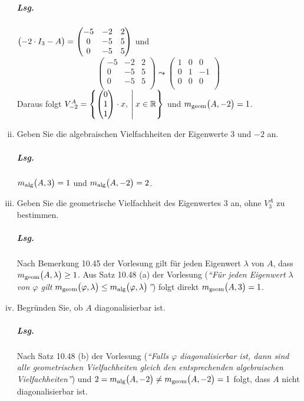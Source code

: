 \documentclass{scrreprt}
\begin{document}
\begin{enumerate}[(i)]
  \subparagraph{Lsg.} $\qty\big(-2 \cdot I_3 - A) =
  \begin{pmatrix}
    -5 & -2 & 2 \\
    0 & -5 & 5 \\
    0 & -5 & 5 \\
  \end{pmatrix}$ und
  \[
    \begin{pmatrix}
      -5 & -2 & 2 \\
      0 & -5 & 5 \\
      0 & -5 & 5 \\
    \end{pmatrix} \leadsto \begin{pmatrix}
      1 & 0 & 0 \\
      0 & 1 & -1 \\
      0 & 0 & 0 \\
    \end{pmatrix}
  \]
  Daraus folgt $V_{-2}^A = \qty{
    \begin{pmatrix}0\\1\\1\end{pmatrix} \cdot x,
    \: \middle| \:
    x \in \mathbb{R}
  }$ und $m_{\text{geom}}\qty\big(A, -2) = 1$.

\item Geben Sie die algebraischen Vielfachheiten der Eigenwerte $3$ und $-2$ an.
  \subparagraph{Lsg.} $m_{\text{alg}}\qty\big(A, 3) = 1$ und
  $m_{\text{alg}}\qty\big(A, -2) = 2$.

\newpage
\item Geben Sie die geometrische Vielfachheit des Eigenwertes $3$ an, ohne
  $V_3^A$ zu bestimmen.
  \subparagraph{Lsg.} Nach Bemerkung 10.45 der Vorlesung gilt für jeden Eigenwert
  $\lambda$ von $A$, dass $m_{\text{geom}}\qty\big(A, \lambda) \geq 1$.
  Aus Satz 10.48 (a) der Vorlesung (\emph{``Für jeden Eigenwert $\lambda$ von
    $\varphi$ gilt $m_{\text{geom}}\qty\big(\varphi, \lambda) \leq
    m_{\text{alg}}\qty\big(\varphi, \lambda)$''}) folgt direkt
  $m_{\text{geom}}\qty\big(A, 3) = 1$.

\item Begründen Sie, ob $A$ diagonalisierbar ist.

  \subparagraph{Lsg.} Nach Satz 10.48 (b) der Vorlesung (\emph{``Falls $\varphi$
    diagonalisierbar ist, dann sind alle geometrischen Vielfachheiten gleich den
    entsprechenden algebraischen Vielfachheiten''}) und
  $2 = m_{\text{alg}}\qty\big(A, -2) \ne m_{\text{geom}}\qty\big(A, -2) = 1$
  folgt, dass $A$ nicht diagonalisierbar ist.


\end{enumerate}
\end{document}
